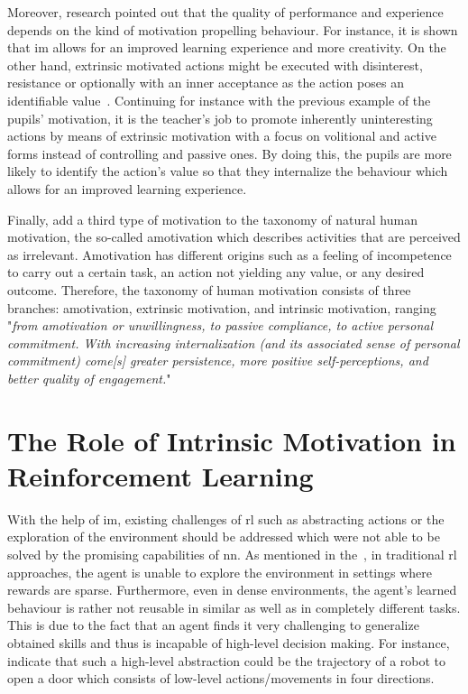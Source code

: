 \documentclass[draft,final]{vutinfth} %
\newcommand{\p}[1]{see p. #1}
\begin{document}
    Moreover, research pointed out that the quality of performance and experience depends on the kind of motivation propelling behaviour.
    For instance, it is shown that \gls{im} allows for an improved learning experience and more creativity.
    On the other hand, extrinsic motivated actions might be executed with disinterest, resistance or optionally with an inner acceptance as the action poses an identifiable value~\citep{ryan_intrinsic_2000}.
    Continuing for instance with the previous example of the pupils' motivation, it is the teacher's job to promote inherently uninteresting actions by means of extrinsic motivation with a focus on volitional and active forms instead of controlling and passive ones.
    By doing this, the pupils are more likely to identify the action's value so that they internalize the behaviour which allows for an improved learning experience.

    Finally, \citeauthor{ryan_intrinsic_2000} add a third type of motivation to the taxonomy of natural human motivation, the so-called amotivation which describes activities that are perceived as irrelevant.
    Amotivation has different origins such as a feeling of incompetence to carry out a certain task, an action not yielding any value, or any desired outcome.
    Therefore, the taxonomy of human motivation consists of three branches: amotivation, extrinsic motivation, and intrinsic motivation, ranging "\textit{from amotivation or unwillingness, to passive compliance, to active personal commitment. With increasing internalization (and its associated sense of personal commitment) come[s] greater persistence, more positive self-perceptions, and better quality of engagement.}"~\citep[\p{60f}]{ryan_intrinsic_2000}


    \section{The Role of Intrinsic Motivation in Reinforcement Learning}

    With the help of \gls{im}, existing challenges of \gls{rl} such as abstracting actions or the exploration of the environment should be addressed which were not able to be solved by the promising capabilities of \gls{nn}.
    As mentioned in the~, in traditional \gls{rl} approaches, the agent is unable to explore the environment in settings where rewards are sparse.
    Furthermore, even in dense environments, the agent's learned behaviour is rather not reusable in similar as well as in completely different tasks.
    This is due to the fact that an agent finds it very challenging to generalize obtained skills and thus is incapable of high-level decision making.
    For instance, \citeauthor{todorov_mujoco_2012} indicate that such a high-level abstraction could be the trajectory of a robot to open a door which consists of low-level actions/movements in four directions.
\end{document}
